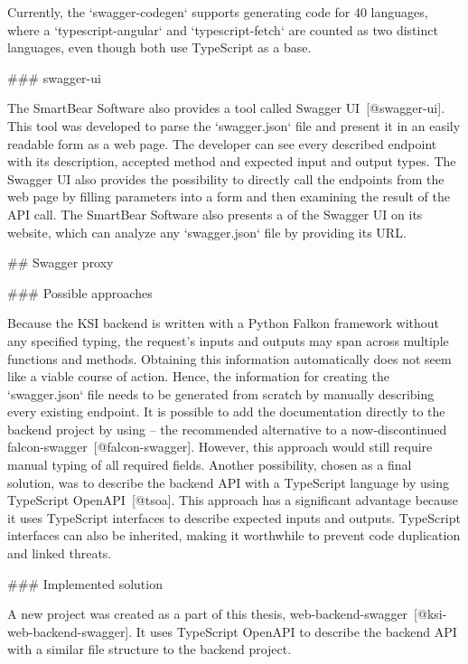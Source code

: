 \documentclass[
  digital, %
  oneside, %
  lof,     %
  nolot,     %
]{fithesis4}
\begin{document}
Currently, the `swagger-codegen` supports generating code for 40 languages, where a `typescript-angular` and `typescript-fetch` are counted as two distinct languages, even though both use TypeScript as a base.

### swagger-ui

The SmartBear Software also provides a tool called Swagger \acrshort{UI}~[@swagger-ui]. This tool was developed to parse the `swagger.json` file and present it in an easily readable form as a web page. The developer can see every described endpoint with its description, accepted method and expected input and output types. The Swagger \acrshort{UI} also provides the possibility to directly call the endpoints from the web page by filling parameters into a form and then examining the result of the \acrshort{API} call. The SmartBear Software also presents a  of the Swagger \acrshort{UI} on its website, which can analyze any `swagger.json` file by providing its \acrshort{URL}.

## Swagger proxy

### Possible approaches

Because the \acrshort{KSI} backend is written with a Python Falkon framework without any specified typing, the request's inputs and outputs may span across multiple functions and methods. Obtaining this information automatically does not seem like a viable course of action. Hence, the information for creating the `swagger.json` file needs to be generated from scratch by manually describing every existing endpoint. It is possible to add the documentation directly to the backend project by using  -- the recommended alternative to a now-discontinued falcon-swagger~[@falcon-swagger]. However, this approach would still require manual typing of all required fields. Another possibility, chosen as a final solution, was to describe the backend \acrshort{API} with a TypeScript language by using TypeScript OpenAPI~[@tsoa]. This approach has a significant advantage because it uses TypeScript interfaces to describe expected inputs and outputs. TypeScript interfaces can also be inherited, making it worthwhile to prevent code duplication and linked threats.

### Implemented solution

A new project was created as a part of this thesis, web-backend-swagger~[@ksi-web-backend-swagger]. It uses TypeScript OpenAPI to describe the backend \acrshort{API} with a similar file structure to the backend project. 
\end{document}

